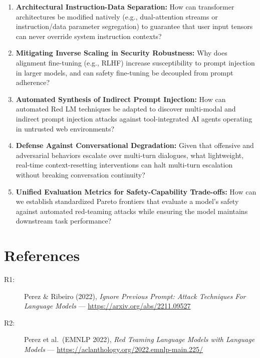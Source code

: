 \documentclass[a4paper,12pt]{report}
\begin{document}
\begin{enumerate}
  \item \textbf{Architectural Instruction-Data Separation:} How can transformer architectures be modified natively (e.g., dual-attention streams or instruction/data parameter segregation) to guarantee that user input tensors can never override system instruction contexts?
  \item \textbf{Mitigating Inverse Scaling in Security Robustness:} Why does alignment fine-tuning (e.g., RLHF) increase susceptibility to prompt injection in larger models, and can safety fine-tuning be decoupled from prompt adherence?
  \item \textbf{Automated Synthesis of Indirect Prompt Injection:} How can automated Red LM techniques be adapted to discover multi-modal and indirect prompt injection attacks against tool-integrated AI agents operating in untrusted web environments?
  \item \textbf{Defense Against Conversational Degradation:} Given that offensive and adversarial behaviors escalate over multi-turn dialogues, what lightweight, real-time context-resetting interventions can halt multi-turn escalation without breaking conversation continuity?
  \item \textbf{Unified Evaluation Metrics for Safety-Capability Trade-offs:} How can we establish standardized Pareto frontiers that evaluate a model's safety against automated red-teaming attacks while ensuring the model maintains downstream task performance?
\end{enumerate}
 
\chapter{References}
 
\begin{description}
  \item[R1:] Perez \& Ribeiro (2022), \textit{Ignore Previous Prompt: Attack Techniques For Language Models} --- \url{https://arxiv.org/abs/2211.09527}
  \item[R2:] Perez et al.\ (EMNLP 2022), \textit{Red Teaming Language Models with Language Models} --- \url{https://aclanthology.org/2022.emnlp-main.225/}
\end{description}
\end{document}
